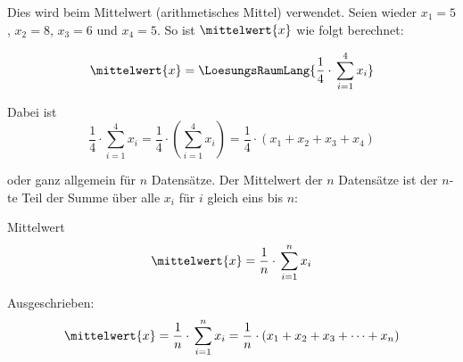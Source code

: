 Dies wird \zB beim Mittelwert (arithmetisches Mittel)
verwendet. Seien wieder $x_1=5$, $x_2=8$, $x_3=6$ und $x_4=5$. So ist
$\mittelwert{x}$ wie folgt berechnet:

$$\mittelwert{x} = \LoesungsRaumLang{\frac{1}{4}\cdot{}\sum_{i=1}^{4}{x_i}}$$

Dabei ist $$\frac{1}{4}\cdot{}\sum_{i=1}^{4}{x_i}=\frac{1}{4}\cdot{}\left( \sum_{i=1}^{4}{x_i}\right) =\frac{1}{4}\cdot{}(x_1 + x_2 + x_3 + x_4)$$

oder ganz allgemein für $n$ Datensätze. Der Mittelwert der $n$
Datensätze ist der $n$-te Teil der Summe über alle $x_i$ für $i$
gleich eins bis $n$:

\begin{gesetz}{Mittelwert}{}
$$\mittelwert{x} = \frac{1}{n}\cdot{}\sum_{i=1}^{n}{x_i}$$
\end{gesetz}

Ausgeschrieben:
$$\mittelwert{x} = \frac{1}{n}\cdot{}\sum_{i=1}^{n}{x_i} = \frac{1}{n}\cdot{}(x_1 + x_2 + x_3 + \dots + x_n)$$

\newpage
